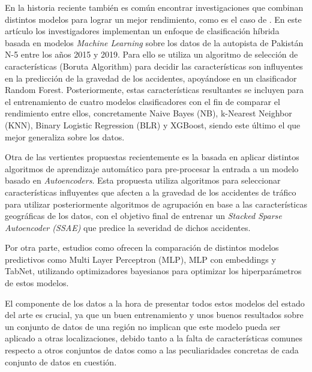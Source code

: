 \documentclass{uathesis-es}
\begin{document}
En la historia reciente también es común encontrar investigaciones que combinan distintos modelos para lograr un mejor rendimiento, como es el caso de \cite{zhang2022hybrid}. En este artículo los investigadores implementan un enfoque de clasificación híbrida basada en modelos \textit{Machine Learning} sobre los datos de la autopista de Pakistán N-5 entre los años 2015 y 2019. Para ello se utiliza un algoritmo de selección de características (Boruta Algorithm) para decidir las características son influyentes en la predicción de la gravedad de los accidentes, apoyándose en un clasificador Random Forest. Posteriormente, estas características resultantes se incluyen para el entrenamiento de cuatro modelos clasificadores con el fin de comparar el rendimiento entre ellos, concretamente Naive Bayes (NB), k-Nearest Neighbor (KNN), Binary Logistic Regression (BLR) y XGBoost, siendo este último el que mejor generaliza sobre los datos.





Otra de las vertientes propuestas recientemente es la basada en aplicar distintos algoritmos de aprendizaje automático para pre-procesar la entrada a un modelo basado en \textit{Autoencoders}. Esta propuesta utiliza algoritmos para seleccionar características influyentes que afecten a la gravedad de los accidentes de tráfico para utilizar posteriormente algoritmos de agrupación en base a las características geográficas de los datos, con el objetivo final de entrenar un \textit{Stacked Sparse Autoencoder (SSAE)} \cite{ma2021analytic} que predice la severidad de dichos accidentes.

Por otra parte, estudios como \cite{Sattar2023} ofrecen la comparación de distintos modelos predictivos como Multi Layer Perceptron (MLP), MLP con embeddings y TabNet, utilizando optimizadores bayesianos para optimizar los hiperparámetros de estos modelos.

El componente de los datos a la hora de presentar todos estos modelos del estado del arte es crucial, ya que un buen entrenamiento y unos buenos resultados sobre un conjunto de datos de una región no implican que este modelo pueda ser aplicado a otras localizaciones, debido tanto a la falta de características comunes respecto a otros conjuntos de datos como a las peculiaridades concretas de cada conjunto de datos en cuestión.
\end{document}
